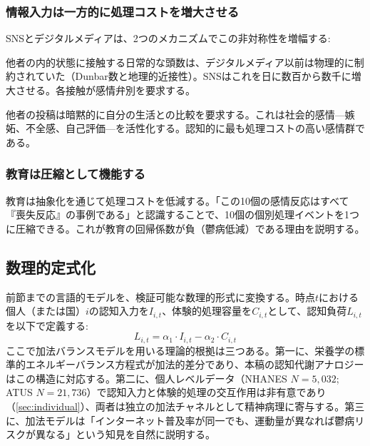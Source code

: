\documentclass[a4paper,11pt,titlepage]{article}
\newcommand{\balanceL}{L}
\newcommand{\cogInput}{I}
\newcommand{\expProc}{C}
\begin{document}
\subsubsection{情報入力は一方的に処理コストを増大させる}

SNSとデジタルメディアは、2つのメカニズムでこの非対称性を増幅する:

\begin{description}[leftmargin=2em]
\item[(a) 曝露量] 他者の内的状態に接触する日常的な頭数は、デジタルメディア以前は物理的に制約されていた（Dunbar数と地理的近接性）。SNSはこれを日に数百から数千に増大させる。各接触が感情弁別を要求する。
\item[(b) 自己参照的比較] 他者の投稿は暗黙的に自分の生活との比較を要求する。これは社会的感情---嫉妬、不全感、自己評価---を活性化する。認知的に最も処理コストの高い感情群である。
\end{description}

\subsubsection{教育は圧縮として機能する}

教育は抽象化を通じて処理コストを低減する。「この10個の感情反応はすべて『喪失反応』の事例である」と認識することで、10個の個別処理イベントを1つに圧縮できる。これが教育の回帰係数が負（鬱病低減）である理由を説明する。


\subsection{数理的定式化}\label{sec:math}

前節までの言語的モデルを、検証可能な数理的形式に変換する。時点$t$における個人（または国）$i$の認知入力を$\cogInput_{i,t}$、体験的処理容量を$\expProc_{i,t}$として、認知負荷$\balanceL_{i,t}$を以下で定義する:
\begin{equation}\label{eq:balance}
  \balanceL_{i,t} = \alpha_1 \cdot \cogInput_{i,t} - \alpha_2 \cdot \expProc_{i,t}
\end{equation}
ここで加法バランスモデルを用いる理論的根拠は三つある。第一に、栄養学の標準的エネルギーバランス方程式が加法的差分であり、本稿の認知代謝アナロジーはこの構造に対応する。第二に、個人レベルデータ（NHANES $N=5{,}032$; ATUS $N=21{,}736$）で認知入力と体験的処理の交互作用は非有意であり（\cref{sec:individual}）、両者は独立の加法チャネルとして精神病理に寄与する。第三に、加法モデルは「インターネット普及率が同一でも、運動量が異なれば鬱病リスクが異なる」という知見を自然に説明する。
\end{document}
